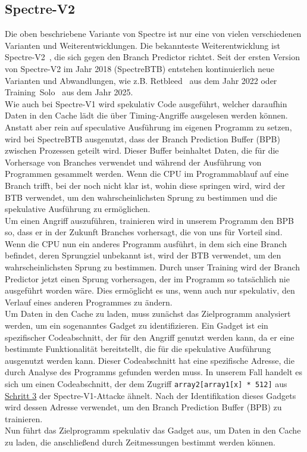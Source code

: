 \subsection{Spectre-V2}
\label{subsec:spectre_spectre-v2}
Die oben beschriebene Variante von Spectre ist nur eine von vielen verschiedenen Varianten und Weiterentwicklungen.
Die bekannteste Weiterentwicklung ist Spectre-V2~\cite{spec_v2}, die sich gegen den Branch Predictor richtet.
Seit der ersten Version von Spectre-V2 im Jahr 2018 (SpectreBTB) entstehen kontinuierlich neue Varianten und Abwandlungen, wie z.B. Retbleed~\cite{spec_v2_retbleed} aus dem Jahr 2022 oder Training~Solo~\cite{training_solo} aus dem Jahr 2025. \\
Wie auch bei Spectre-V1 wird spekulativ Code ausgeführt, welcher daraufhin Daten in den Cache lädt die über Timing-Angriffe ausgelesen werden können.
Anstatt aber rein auf speculative Ausführung im eigenen Programm zu setzen, wird bei SpectreBTB ausgenutzt, dass der Branch Prediction Buffer (BPB) zwischen Prozessen geteilt wird.
Dieser Buffer beinhaltet Daten, die für die Vorhersage von Branches verwendet und während der Ausführung von Programmen gesammelt werden.
Wenn die CPU im Programmablauf auf eine Branch trifft, bei der noch nicht klar ist, wohin diese springen wird, wird der BTB verwendet, um den wahrscheinlichsten Sprung zu bestimmen und die spekulative Ausführung zu ermöglichen. \\
Um einen Angriff auszuführen, trainieren wird in unserem Programm den BPB so, dass er in der Zukunft Branches vorhersagt, die von uns für Vorteil sind.
Wenn die CPU nun ein anderes Programm ausführt, in dem sich eine Branch befindet, deren Sprungziel unbekannt ist, wird der BTB verwendet, um den wahrscheinlichsten Sprung zu bestimmen.
Durch unser Training wird der Branch Predictor jetzt einen Sprung vorhersagen, der im Programm so tatsächlich nie ausgeführt worden wäre.
Dies ermöglicht es uns, wenn auch nur spekulativ, den Verlauf eines anderen Programmes zu ändern. \\
Um Daten in den Cache zu laden, muss zunächst das Zielprogramm analysiert werden, um ein sogenanntes Gadget zu identifizieren.
Ein Gadget ist ein spezifischer Codeabschnitt, der für den Angriff genutzt werden kann, da er eine bestimmte Funktionalität bereitstellt, die für die spekulative Ausführung ausgenutzt werden kann.
Dieser Codeabschnitt hat eine spezifische Adresse, die durch Analyse des Programms gefunden werden muss.
In unserem Fall handelt es sich um einen Codeabschnitt, der dem Zugriff \texttt{array2[array1[x] * 512]} aus \hyperref[itm:spectre_step3_code]{\underline{Schritt 3}} der Spectre-V1-Attacke ähnelt.
Nach der Identifikation dieses Gadgets wird dessen Adresse verwendet, um den Branch Prediction Buffer (BPB) zu trainieren. \\
Nun führt das Zielprogramm spekulativ das Gadget aus, um Daten in den Cache zu laden, die anschließend durch Zeitmessungen bestimmt werden können.

